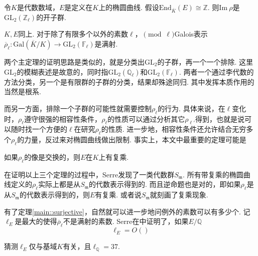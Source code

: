 \begin{cthm}
    令$K$是代数数域，$E$是定义在$K$上的椭圆曲线. 假设$\mathrm{End}_{\overline{K}}(E) \cong \mathbb{Z}$. 则$\mathrm{Im}\ \rho$是$\mathrm{GL}_2(\mathbb{Z}_{\ell})$的开子群. \label{main::open_image}
\end{cthm}

\begin{cthm}
    $K, E$同上. 对于除了有限多个以外的素数$\ell$，$\pmod{\ell}$Galois表示$\overline{\rho}_{\ell}: \mathrm{Gal}(\overline{K}/K)\to \mathrm{GL}_2(\mathbb{F}_{\ell})$是满射. \label{main::surjective}
\end{cthm}

两个主定理的证明思路是类似的，就是分类出$\mathrm{GL}_2$的子群，再一个一个排除. 这里$\mathrm{GL}_2$的模糊表述是故意的，同时指$\mathrm{GL}_2(\mathbb{Q}_{\ell})$和$\mathrm{GL}_2(\mathbb{F}_{\ell})$. 两者一个通过李代数的方法分类，另一个是有限群的子群的分类，结果却殊途同归. 其中发挥本质作用的当然是根系.

而另一方面，排除一个子群的可能性就需要控制$\rho_{\ell}$的行为. 具体来说，在$\ell$变化时，$\rho_{\ell}$遵守很强的相容性条件，$\rho_{\ell}$的性质可以通过分析其它$\rho_{\ell'}$得到，也就是说可以随时找一个方便的$\ell$在研究$\rho_{\ell}$的性质. 进一步地，相容性条件还允许结合无穷多个$\rho_{\ell}$的力量，反过来对椭圆曲线做出限制. 事实上，本文中最重要的定理可能是

\begin{cthm}
    如果$\rho_{\ell}$的像是交换的，则$E$在$K$上有复乘.
\end{cthm}

在证明以上三个定理的过程中，Serre发现了一类代数群$S_{\mathfrak{m}}$. 所有带复乘的椭圆曲线定义的$\rho_{\ell}$实际上都是从$S_{\mathfrak{m}}$的代数表示得到的. 而且逆命题也是对的，即如果$\rho_{\ell}$是从$S_{\mathfrak{m}}$的代数表示得到的，则$E$有复乘. 或者说$S_{\mathfrak{m}}$就刻画了复乘现象.

有了定理\ref{main::surjective}，自然就可以进一步地问例外的素数可以有多少个.
记$\ell_{E}$是最大的使得$\overline{\rho}_{\ell}$不是满射的素数.
Serre在\parencite{serre1981quelques}中证明了，如果$E/\mathbb{Q}$
\begin{equation}
    \ell_{E} = O()
\end{equation}

猜测$\ell_{E}$仅与基域$K$有关，且$\ell_{\mathbb{Q}}=37$.
